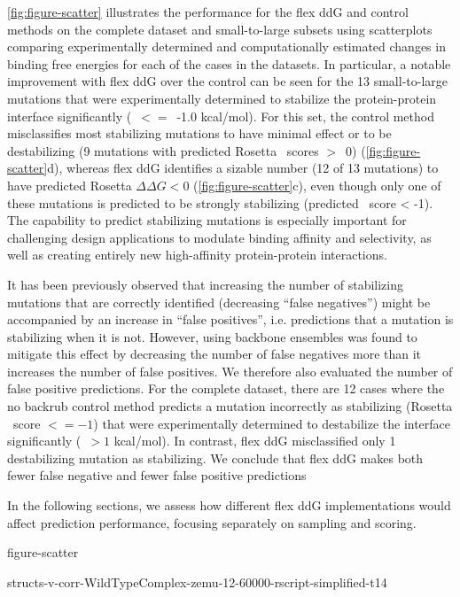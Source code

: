 \cref{fig:figure-scatter} illustrates the performance for the flex ddG and control methods on the complete dataset and small-to-large subsets using scatterplots comparing experimentally determined and computationally estimated changes in binding free energies for each of the cases in the datasets. In particular, a notable improvement with flex ddG over the control can be seen for the 13 small-to-large mutations that were experimentally determined to stabilize the protein-protein interface significantly (\ddg\ $<=$\ -1.0 kcal/mol). For this set, the control method misclassifies most stabilizing mutations to have minimal effect or to be destabilizing (9 mutations with predicted Rosetta \ddg\ scores $>$\ 0) (\cref{fig:figure-scatter}d), whereas flex ddG identifies a sizable number (12 of 13 mutations) to have predicted Rosetta $\Delta\Delta G < 0$ (\cref{fig:figure-scatter}c), even though only one of these mutations is predicted to be strongly stabilizing (predicted \ddg\ score < -1). The capability to predict stabilizing mutations is especially important for challenging design applications to modulate binding affinity and selectivity, as well as creating entirely new high-affinity protein-protein interactions.

It has been previously observed that increasing the number of stabilizing mutations that are correctly identified (decreasing ``false negatives'') might be accompanied by an increase in ``false positives'', i.e. predictions that a mutation is stabilizing when it is not. However, using backbone ensembles was found to mitigate this effect by decreasing the number of false negatives more than it increases the number of false positives\cite{davey_improving_2014}. We therefore also evaluated the number of false positive predictions. For the complete dataset, there are 12 cases where the no backrub control method predicts a mutation incorrectly as stabilizing (Rosetta \ddg\ score $<= -1$) that were experimentally determined to destabilize the interface significantly (\ddg\ $> 1$ kcal/mol). In contrast, flex ddG misclassified only 1 destabilizing mutation as stabilizing. We conclude that flex ddG makes both fewer false negative and fewer false positive predictions

In the following sections, we assess how different flex ddG implementations would affect prediction performance, focusing separately on sampling and scoring.

{figure-scatter}

{structs-v-corr-WildTypeComplex-zemu-12-60000-rscript-simplified-t14}


